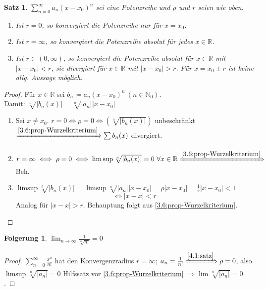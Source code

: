 \documentclass[14pt,titlepage,ngerman,a4paper,headsepline,DIV15,halfparskip*]{scrartcl}
\newcommand{\N}{\mathbb{N}}
\newcommand{\R}{\mathbb{R}}
\theoremstyle{named}
\theoremstyle{dotless}
\newtheorem{satz}[namedtheorem]{Satz}
\newtheorem*{folgerung}{Folgerung}
\begin{document}
\begin{satz} \label{4.1:satz}
	$\sum_{n=0}^{\infty} a_{n} (x - x_{0})^{n}$ sei eine Potenzreihe und $\rho$ und $r$ seien wie oben.
	\begin{enumerate}
		\item Ist $r = 0$, so konvergiert die Potenzreihe nur für $x = x_{0}$.
		\item Ist $r = \infty$, so konvergiert die Potenzreihe absolut für jedes $x \in \R$.
		\item Ist $r \in (0, \infty)$, so konvergiert die Potenzreihe absolut für $x \in \R$ mit $|x - x_{0}| < r$, sie divergiert für $x \in \R$ mit $|x - x_{0}| > r$. Für $x = x_{0} \pm r$ ist keine allg. Aussage möglich.
	\end{enumerate}
\end{satz}

\begin{proof}
	Für $x \in \R$ sei $b_{n} \coloneqq a_{n} (x - x_{0})^{n} ~(n \in \N_{0})$. \\
	Damit: $\sqrt[n]{|b_{n}(x)|} = \sqrt[n]{|a_{n}|} |x - x_{0}|$
	\begin{enumerate}
		\item Sei $x \neq x_{0}$. $r = 0 \iff \rho = 0 \iff \left( \sqrt[n]{|b_{n}(x)|} \right)$ unbeschränkt $\xRightarrow[]{\ref{3.6:prop-Wurzelkriterium}} \sum b_{n}(x)$ divergiert.
		\item $r = \infty \iff \rho = 0 \iff \limsup \sqrt[n]{|b_{n}(x)|} = 0 ~\forall x \in \R \xRightarrow[]{\ref{3.6:prop-Wurzelkriterium}}$ Beh.
		\item $\limsup \sqrt[b]{|b_{n}(x)|} = \limsup \sqrt[n]{|a_{n}|} |x - x_{0}| = \rho |x - x_{0}| = \frac{1}{r} |x - x_{0}| < 1$ 
			$$ \iff |x - x| < r $$
			Analog für $|x - x| > r$. Behauptung folgt aus \ref{3.6:prop-Wurzelkriterium}.
	\end{enumerate}	
\end{proof}


\begin{folgerung}
	$\lim_{n \rightarrow \infty} \frac{1}{\sqrt[n]{n!}} = 0$	
\end{folgerung}

\begin{proof}
	$\sum_{n=0}^{\infty} \frac{x^{n}}{n!}$ hat den Konvergenzradius $r = \infty$; $a_{n} = \frac{1}{n!} \xRightarrow[]{\ref{4.1:satz}} \rho = 0$, also $\limsup \sqrt[n]{|a_{n}|} = 0$ Hilfssatz vor \ref{3.6:prop-Wurzelkriterium} $\Rightarrow \lim \sqrt[n]{|a_{n}|} = 0$.
\end{proof}
\end{document}
